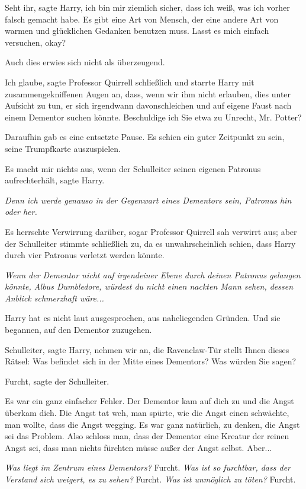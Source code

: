 \glqq{}Seht ihr\grqq{}, sagte Harry, \glqq{}ich bin mir ziemlich sicher, dass ich
weiß, was ich vorher falsch gemacht habe. Es gibt eine Art von Mensch, der eine
andere Art von warmen und glücklichen Gedanken benutzen muss. Lasst es mich
einfach versuchen, okay?\grqq{}

Auch dies erwies sich nicht als überzeugend.

\glqq{}Ich glaube\grqq{}, sagte Professor Quirrell schließlich und starrte Harry
mit zusammengekniffenen Augen an, \glqq{}dass, wenn wir ihm nicht erlauben, dies
unter Aufsicht zu tun, er sich irgendwann davonschleichen und auf eigene Faust
nach einem Dementor suchen könnte. Beschuldige ich Sie etwa zu Unrecht, Mr.
Potter?\grqq{}

Daraufhin gab es eine entsetzte Pause. Es schien ein guter Zeitpunkt zu sein,
seine Trumpfkarte auszuspielen.

\glqq{}Es macht mir nichts aus, wenn der Schulleiter seinen eigenen Patronus
aufrechterhält\grqq{}, sagte Harry.

\emph{Denn ich werde genauso in der Gegenwart eines Dementors sein, Patronus
hin oder her.}

Es herrschte Verwirrung darüber, sogar Professor Quirrell sah verwirrt aus; aber
der Schulleiter stimmte schließlich zu, da es unwahrscheinlich schien, dass
Harry durch vier Patronus verletzt werden könnte.

\emph{Wenn der Dementor nicht auf irgendeiner Ebene durch deinen Patronus
gelangen könnte, Albus Dumbledore, würdest du nicht einen nackten Mann sehen,
dessen Anblick schmerzhaft wäre...}

Harry hat es nicht laut ausgesprochen, aus naheliegenden Gründen. Und sie
begannen, auf den Dementor zuzugehen.

\glqq{}Schulleiter\grqq{}, sagte Harry, \glqq{}nehmen wir an, die Ravenclaw-Tür
stellt Ihnen dieses Rätsel: Was befindet sich in der Mitte eines Dementors? Was
würden Sie sagen?\grqq{}

\glqq{}Furcht\grqq{}, sagte der Schulleiter.

Es war ein ganz einfacher Fehler. Der Dementor kam auf dich zu und die Angst
überkam dich. Die Angst tat weh, man spürte, wie die Angst einen schwächte, man
wollte, dass die Angst wegging. Es war ganz natürlich, zu denken, die Angst sei
das Problem. Also schloss man, dass der Dementor eine Kreatur der reinen Angst
sei, dass man nichts fürchten müsse außer der Angst selbst. Aber...

\emph{Was liegt im Zentrum eines Dementors?}
Furcht.
\emph{Was ist so furchtbar, dass der Verstand sich weigert, es zu sehen?}
Furcht.
\emph{Was ist unmöglich zu töten?}
Furcht.

